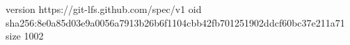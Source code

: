 version https://git-lfs.github.com/spec/v1
oid sha256:8e0a85d03e9a0056a7913b26b6f1104cbb42fb701251902ddcf60bc37e211a71
size 1002
